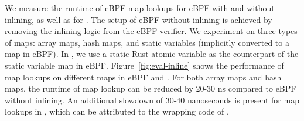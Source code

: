 
We measure the runtime of eBPF map lookups for eBPF with and without inlining,
    as well as for \projname{}.
The setup of eBPF without inlining is achieved by removing the inlining logic
    from the eBPF verifier.
We experiment on three types of maps: array maps, hash maps, and static
    variables (implicitly converted to a map in eBPF).
In \projname{}, we use a static Rust atomic variable as the counterpart of the
    static variable map in eBPF.
Figure~\ref{fig:eval-inline} shows the performance of map lookups on different
    maps in eBPF and \projname{}.
For both array maps and hash maps, the
    runtime of map lookup can be reduced by 20-30 ns compared to eBPF without
    inlining.
An additional slowdown of 30-40 nanoseconds is present for map lookups in
    \projname{}, which can be attributed to the wrapping code of \projname{}.
